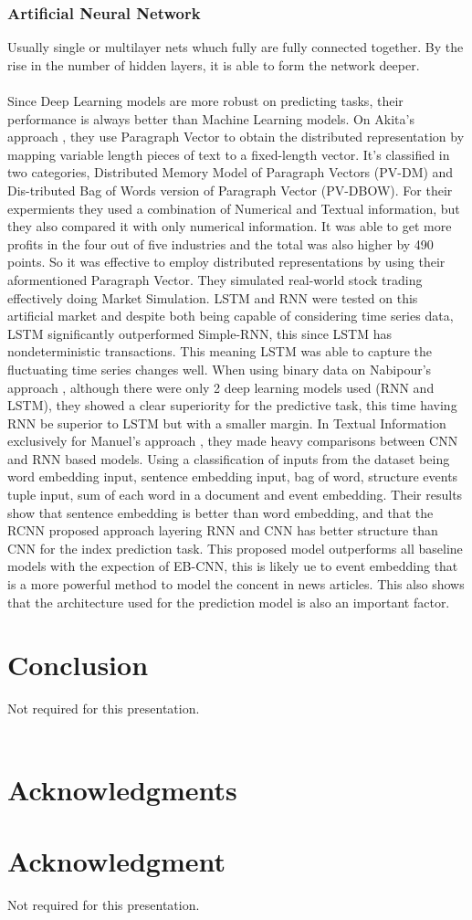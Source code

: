 \documentclass[conference]{IEEEtran}
\begin{document}
\subsubsection{Artificial Neural Network}
Usually single or multilayer nets whuch fully are fully connected together. By the rise in the number of hidden layers, it is able to form the network deeper.
\\\\
Since Deep Learning models are more robust on predicting tasks, their performance is always better than Machine Learning models.
On Akita's approach \cite{Akita2016}, they use Paragraph Vector to obtain the distributed representation by mapping variable length pieces of text to a fixed-length vector.
It's classified in two categories, Distributed Memory Model of Paragraph Vectors (PV-DM) and Dis-tributed Bag of Words version of Paragraph Vector (PV-DBOW). For their expermients they used a combination of Numerical and Textual
information, but they also compared it with only numerical information. It was able to get more profits in the four out of five industries and the total was also higher by 490 points. So it was effective to employ distributed representations
by using their aformentioned Paragraph Vector. They simulated real-world stock trading effectively doing Market Simulation. LSTM and RNN were tested on this artificial market and despite both being capable of considering time series data, LSTM
significantly outperformed Simple-RNN, this since LSTM has nondeterministic transactions. This meaning LSTM was able to capture the fluctuating time series changes well.
When using binary data on Nabipour's approach \cite{nabipour2020predicting}, although there were only 2 deep learning models used (RNN and LSTM), they showed a clear superiority for the predictive task, this time having RNN be superior to LSTM but with a smaller margin.
In Textual Information exclusively for Manuel's approach \cite{Vargas2017}, they made heavy comparisons between CNN and RNN based models. Using a classification of inputs from the dataset being word embedding input, sentence embedding input, bag of word, structure events tuple input, sum of each word in a document and event embedding.
Their results show that sentence embedding is better than word embedding, and that the RCNN proposed approach layering RNN and CNN has better structure than CNN for the index prediction task. This proposed model outperforms all baseline models with the expection of EB-CNN, this is likely ue to event embedding that is a more powerful method
to model the concent in news articles. This also shows that the architecture used for the prediction model is also an important factor.


\section{Conclusion}
Not required for this presentation.
\\\\
\ifCLASSOPTIONcompsoc
  \section*{Acknowledgments}
\else
  \section*{Acknowledgment}
\fi
Not required for this presentation.



\end{document}
